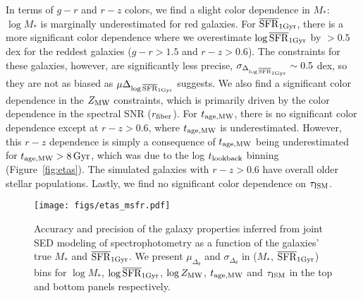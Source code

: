 In terms of $g-r$ and $r-z$ colors, we find a slight color dependence in $M_*$:
$\log M_*$ is marginally underestimated for red galaxies. 
For $\overline{\rm SFR}_{\rm 1Gyr}$, there is a more significant color dependence where we
overestimate $\log\overline{\rm SFR}_{\rm 1Gyr}$ by $>0.5$ dex for the reddest galaxies 
($g-r > 1.5$ and $r-z> 0.6$).
The constraints for these galaxies, however, are significantly less precise,
$\sigma_{\Delta_{\log\overline{\rm SFR}_{\rm 1Gyr}}} \sim 0.5$ dex, so they are not as biased as
$\mu{\Delta_{\log\overline{\rm SFR}_{\rm 1Gyr}}}$ suggests.
We also find a significant color dependence in the $Z_{\rm MW}$ constraints,
which is primarily driven by the color dependence in the spectral SNR ($r_{\rm
fiber}$).  
For $t_{\rm age, MW}$, there is no significant color dependence except at $r - z > 0.6$,
where $t_{\rm age, MW}$ is underestimated. 
However, this $r - z$ dependence is simply a consequence of $t_{\rm age, MW}$ being
underestimated for $t_{\rm age, MW} > 8\,{\rm Gyr}$, which was due to the log $t_{\rm lookback}$
binning (Figure~\ref{fig:etas}).
The simulated galaxies with $r - z > 0.6$ have overall older stellar populations.
Lastly, we find no significant color dependence on $\tau_{\rm ISM}$. 



\begin{figure}
\begin{center}
    \texttt{[image: figs/etas\_msfr.pdf]} \label{fig:etas_msfr}
    \caption{
        Accuracy and precision of the galaxy properties inferred from joint SED
        modeling of spectrophotometry as a function of the galaxies' true $M_*$
        and $\overline{\rm SFR}_{\rm 1Gyr}$. 
        We present $\mu_{\Delta_{\theta}}$ and $\sigma_{\Delta_{\theta}}$ in
        ($M_*$, $\overline{\rm SFR}_{\rm 1Gyr}$) bins for $\log M_*$, $\log\overline{\rm SFR}_{\rm 1Gyr}$, $\log Z_{\rm
        MW}$, $t_{\rm age, MW}$ and $\tau_{\rm ISM}$ in the top and bottom
        panels respectively. 
    }
\end{center}
\end{figure}



